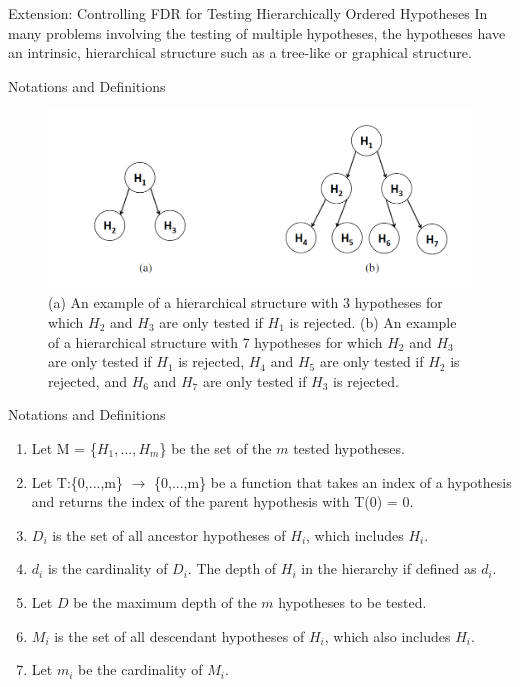 \documentclass{beamer}
\begin{document}
\begin{frame}[t]{Extension: Controlling FDR for Testing Hierarchically Ordered Hypotheses}\vspace{10pt}
In many problems involving the testing of multiple hypotheses, the hypotheses have an intrinsic, hierarchical structure such as a tree-like or graphical structure.
\end{frame}


\begin{frame}[t]{Notations and Definitions}\vspace{10pt}

\begin{figure}[H]
	\centering
	\includegraphics[scale=0.65]{"hierarchical structure"}
	\caption{(a) An example of a hierarchical structure with 3 hypotheses for which $H_2$ and $H_3$ are only tested if $H_1$ is rejected. (b) An example of a hierarchical structure with 7 hypotheses for which $H_2$ and $H_3$ are only tested if $H_1$ is rejected, $H_4$ and $H_5$ are only tested if $H_2$ is rejected, and $H_6$ and $H_7$ are only tested if $H_3$ is rejected. }
	\label{fig:hierarchical-structure}
\end{figure}

\end{frame}

\begin{frame}[t]{Notations and Definitions}\vspace{10pt}
\begin{enumerate}

	\item Let M = \{$H_1,...,H_m$\} be the set of the $m$ tested hypotheses.
	\item Let T:\{0,...,m\} $\rightarrow$ \{0,...,m\} be a function that takes an index of a hypothesis and returns the index of the parent hypothesis with T(0) = 0.
	\item $D_i$ is the set of all ancestor hypotheses of $H_i$, which includes $H_i$.
	\item $d_i$ is the cardinality of $D_i$. The depth of $H_i$ in the hierarchy if defined as $d_i$.
	\item Let $D$ be the maximum depth of the $m$ hypotheses to be tested.
	\item $M_i$ is the set of all descendant hypotheses of $H_i$, which also includes $H_i$.
	\item Let $m_i$ be the cardinality of $M_i$.

	
\end{enumerate}
\end{frame}
\end{document}
